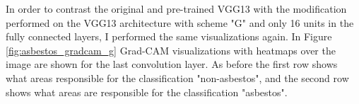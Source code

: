 \begin{figure}[!h]
{}
\label{fig:vgg13_filter_activation}
\end{figure}

In order to contrast the original and pre-trained VGG13 with the modification performed on the VGG13 architecture with scheme "G" and only 16 units in the fully connected layers, I performed the same visualizations again. In Figure \ref{fig:asbestos_gradcam_g} Grad-CAM visualizations with heatmaps over the image are shown for the last convolution layer. As before the first row shows what areas responsible for the classification "non-asbestos", and the second row shows what areas are responsible for the classification "asbestos".

